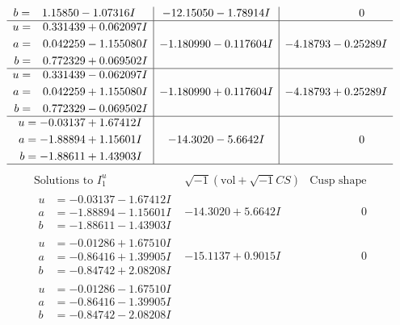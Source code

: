 \documentclass[1p]{elsarticle_modified}
\theoremstyle{definition}
\newcommand{\I}{\sqrt{-1}}
\begin{document}
$$\begin{array}{c|c|c}
\begin{aligned}
b &= \phantom{-}1.15850 - 1.07316 I\end{aligned}
 & -12.15050 - 1.78914 I & \phantom{-0.000000 } 0 \\ \hline\begin{aligned}
u &= \phantom{-}0.331439 + 0.062097 I \\
a &= \phantom{-}0.042259 - 1.155080 I \\
b &= \phantom{-}0.772329 + 0.069502 I\end{aligned}
 & -1.180990 - 0.117604 I & -4.18793 - 0.25289 I \\ \hline\begin{aligned}
u &= \phantom{-}0.331439 - 0.062097 I \\
a &= \phantom{-}0.042259 + 1.155080 I \\
b &= \phantom{-}0.772329 - 0.069502 I\end{aligned}
 & -1.180990 + 0.117604 I & -4.18793 + 0.25289 I \\ \hline\begin{aligned}
u &= -0.03137 + 1.67412 I \\
a &= -1.88894 + 1.15601 I \\
b &= -1.88611 + 1.43903 I\end{aligned}
 & -14.3020 - 5.6642 I & \phantom{-0.000000 } 0\\
 \hline 
 \end{array}$$\newpage$$\begin{array}{c|c|c}  
\text{Solutions to }I^u_{1}& \I (\text{vol} + \sqrt{-1}CS) & \text{Cusp shape}\\
 \hline 
\begin{aligned}
u &= -0.03137 - 1.67412 I \\
a &= -1.88894 - 1.15601 I \\
b &= -1.88611 - 1.43903 I\end{aligned}
 & -14.3020 + 5.6642 I & \phantom{-0.000000 } 0 \\ \hline\begin{aligned}
u &= -0.01286 + 1.67510 I \\
a &= -0.86416 + 1.39905 I \\
b &= -0.84742 + 2.08208 I\end{aligned}
 & -15.1137 + 0.9015 I & \phantom{-0.000000 } 0 \\ \hline\begin{aligned}
u &= -0.01286 - 1.67510 I \\
a &= -0.86416 - 1.39905 I \\
b &= -0.84742 - 2.08208 I\end{aligned}

\end{array}$$
\end{document}
